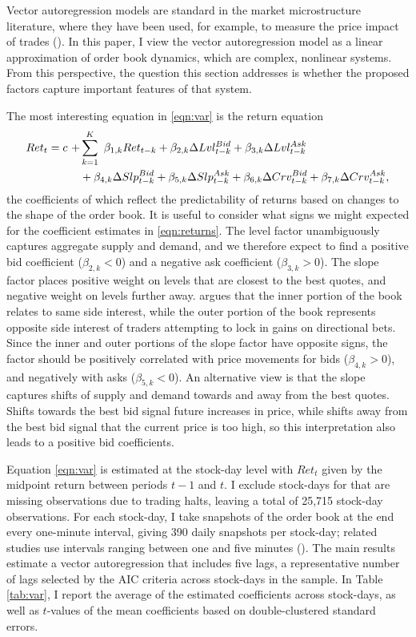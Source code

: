 	Vector autoregression models are standard in the market microstructure literature, where they have been used, for example, to measure the price impact of trades (\citet{Hasbrouck1991}). In this paper, I view the vector autoregression model as a linear approximation of order book dynamics, which are complex, nonlinear systems. From this perspective, the question this section addresses is whether the proposed factors capture important features of that system.

	The most interesting equation in \eqref{eqn:var} is the return equation
	\begin{align}
	\label{eqn:returns}
	Ret_t = c \ + & \sum_{k=1}^{K} \ \beta_{1,k} Ret_{t-k} + \beta_{2, k} \Delta Lvl_{t-k}^{Bid} + \beta_{3, k} \Delta Lvl_{t-k}^{Ask} \notag \\
	& + \beta_{4, k} \Delta Slp_{t-k}^{Bid} + \beta_{5, k} \Delta Slp_{t-k}^{Ask} + \beta_{6, k}\Delta Crv_{t-k}^{Bid} + \beta_{7, k} \Delta Crv_{t-k}^{Ask},
	\end{align}
	the coefficients of which reflect the predictability of returns based on changes to the shape of the order book. It is useful to consider what signs we might expected for the coefficient estimates in \eqref{eqn:returns}. The level factor unambiguously captures aggregate supply and demand, and we therefore expect to find a positive bid coefficient ($\beta_{2, k} < 0$) and a negative ask coefficient ($\beta_{3, k} > 0$). The slope factor places positive weight on levels that are closest to the best quotes, and negative weight on levels further away. \citet{Yuferova2015} argues that the inner portion of the book relates to same side interest, while the outer portion of the book represents opposite side interest of traders attempting to lock in gains on directional bets. Since the inner and outer portions of the slope factor have opposite signs, the factor should be positively correlated with price movements for bids ($\beta_{4,k} > 0$), and negatively with asks ($\beta_{5,k} < 0$). An alternative view is that the slope captures shifts of supply and demand towards and away from the best quotes. Shifts towards the best bid signal future increases in price, while shifts away from the best bid signal that the current price is too high, so this interpretation also leads to a positive bid coefficients.

	Equation \eqref{eqn:var} is estimated at the stock-day level with $Ret_t$ given by the midpoint return between periods $t-1$ and $t$. I exclude stock-days for that are missing observations due to trading halts, leaving a total of 25,715 stock-day observations. For each stock-day, I take snapshots of the order book at the end every one-minute interval, giving 390 daily snapshots per stock-day; related studies use intervals ranging between one and five minutes (\citet{Yuferova2015,Cao2009}). The main results estimate a vector autoregression that includes five lags, a representative number of lags selected by the AIC criteria across stock-days in the sample. In Table \ref{tab:var}, I report the average of the estimated coefficients across stock-days, as well as $t$-values of the mean coefficients based on double-clustered standard errors.

